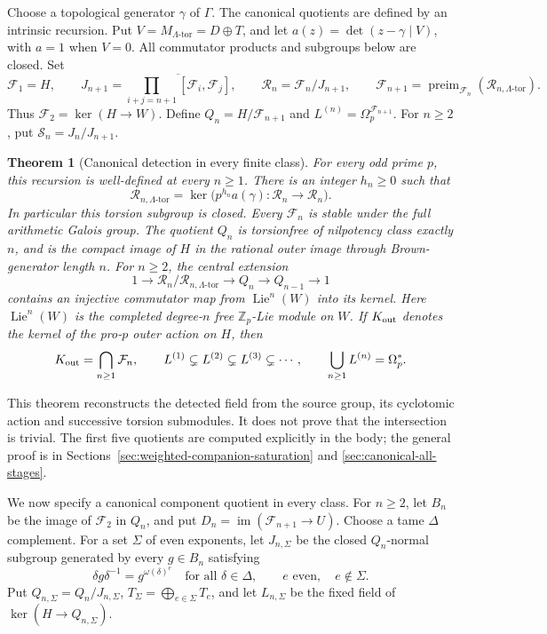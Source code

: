 \documentclass[11pt]{article}
\newtheorem{theorem}{Theorem}[section]
\theoremstyle{definition}\newtheorem{definition}[theorem]{Definition}
\begin{document}
Choose a topological generator \(\gamma\) of \(\Gamma\).
The canonical quotients are defined by an intrinsic recursion. Put
\(V=M_{\Lambda\text{-tor}}=D\oplus T\), and let
\(a(z)=\det(z-\gamma\mid V)\), with \(a=1\) when \(V=0\).
All commutator products and subgroups below are closed. Set
\[
 \mathcal F_1=H,\qquad
 J_{n+1}=\overline{\prod_{i+j=n+1}[\mathcal F_i,\mathcal F_j]},\qquad
 \mathcal R_n=\mathcal F_n/J_{n+1},\qquad
 \mathcal F_{n+1}=\operatorname{preim}_{\mathcal F_n}(\mathcal R_{n,\Lambda\text{-tor}}).
\]
Thus \(\mathcal F_2=\ker(H\to W)\). Define
\(Q_n=H/\mathcal F_{n+1}\) and \(L^{(n)}=\Omega_p^{\mathcal F_{n+1}}\).
For \(n\geq2\), put \(\mathcal S_n=J_n/J_{n+1}\).

\begin{theorem}[Canonical detection in every finite class]
\label{thm:canonical-all-stages}
For every odd prime \(p\), this recursion is well-defined at every
\(n\geq1\). There is an integer \(h_n\geq0\) such that
\[
 \mathcal R_{n,\Lambda\text{-tor}}=\ker\bigl(p^{h_n}a(\gamma):\mathcal R_n\to \mathcal R_n\bigr).
\]
In particular this torsion subgroup is closed. Every \(\mathcal F_n\) is stable
under the full arithmetic Galois group. The quotient \(Q_n\) is
torsionfree of nilpotency class exactly \(n\), and is the compact
image of \(H\) in the rational outer image through Brown-generator
length \(n\). For \(n\geq2\), the central extension
\[
 1\longrightarrow \mathcal R_n/\mathcal R_{n,\Lambda\text{-tor}}
 \longrightarrow Q_n\longrightarrow Q_{n-1}\longrightarrow1
\]
contains an injective commutator map from
\(\operatorname{Lie}^n(W)\) into its kernel. Here
\(\operatorname{Lie}^n(W)\) is the completed degree-\(n\) free
\(\mathbb Z_p\)-Lie module on \(W\). If \(K_{\rm out}\) denotes
the kernel of the pro-\(p\) outer action on \(H\), then
\[
 K_{\rm out}=\bigcap_{n\geq1}\mathcal F_n,\qquad
 L^{(1)}\subsetneq L^{(2)}\subsetneq L^{(3)}\subsetneq\cdots,
 \qquad \bigcup_{n\geq1}L^{(n)}=\Omega_p^*.
\]
\end{theorem}
This theorem reconstructs the detected field from the source group,
its cyclotomic action and successive torsion submodules. It does not
prove that the intersection is trivial. The first five quotients are
computed explicitly in the body; the general proof is in
Sections~\ref{sec:weighted-companion-saturation} and
\ref{sec:canonical-all-stages}.

We now specify a canonical component quotient in every class.
For \(n\geq2\), let \(B_n\) be the image of \(\mathcal F_2\) in \(Q_n\),
and put \(D_n=\operatorname{im}(\mathcal F_{n+1}\to U)\). Choose a tame
\(\Delta\) complement. For a set \(\Sigma\) of even exponents,
let \(J_{n,\Sigma}\) be the closed \(Q_n\)-normal subgroup generated
by every \(g\in B_n\) satisfying
\[
 \delta g\delta^{-1}=g^{\omega(\delta)^e}
 \quad\text{for all }\delta\in\Delta,
 \qquad e\text{ even},\quad e\notin\Sigma.
\]
Put \(Q_{n,\Sigma}=Q_n/J_{n,\Sigma}\),
\(T_\Sigma=\bigoplus_{e\in\Sigma}T_e\), and let \(L_{n,\Sigma}\)
be the fixed field of \(\ker(H\to Q_{n,\Sigma})\).
\end{document}
